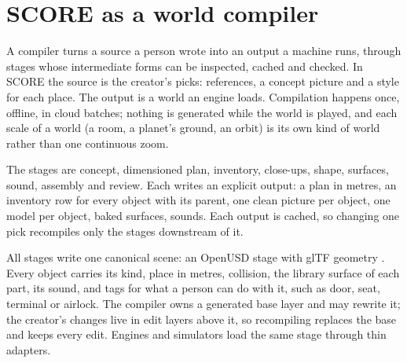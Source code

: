 \section{SCORE as a world compiler}\label{score-as-a-world-compiler}

A compiler turns a source a person wrote into an output a machine runs, through stages whose intermediate forms can be inspected, cached and checked. In SCORE the source is the creator's picks: references, a concept picture and a style for each place. The output is a world an engine loads. Compilation happens once, offline, in cloud batches; nothing is generated while the world is played, and each scale of a world (a room, a planet's ground, an orbit) is its own kind of world rather than one continuous zoom.

The stages are concept, dimensioned plan, inventory, close-ups, shape, surfaces, sound, assembly and review. Each writes an explicit output: a plan in metres, an inventory row for every object with its parent, one clean picture per object, one model per object, baked surfaces, sounds. Each output is cached, so changing one pick recompiles only the stages downstream of it.

All stages write one canonical scene: an OpenUSD stage \citep{openusd} with glTF geometry \citep{gltf2}. Every object carries its kind, place in metres, collision, the library surface of each part, its sound, and tags for what a person can do with it, such as door, seat, terminal or airlock. The compiler owns a generated base layer and may rewrite it; the creator's changes live in edit layers above it, so recompiling replaces the base and keeps every edit. Engines and simulators load the same stage through thin adapters.

\begin{center}\end{center}
